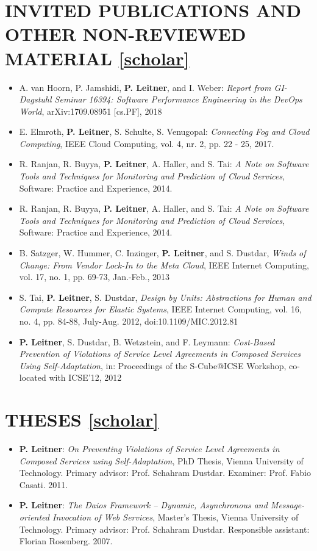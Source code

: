 \documentclass[paper=letter,fontsize=11pt]{scrartcl} %
\newcommand{\NewPart}[2]{\section*{\uppercase{#1} #2}}
\begin{document}
\NewPart{Invited Publications and Other Non-Reviewed Material}{\href{https://scholar.google.ch/citations?user=wZ9f8CAAAAAJ}{[scholar]}}

\begin{itemize}
	\item A. van Hoorn, P. Jamshidi, \textbf{P. Leitner}, and I. Weber:
	\emph{Report from GI-Dagstuhl Seminar 16394: Software Performance Engineering in the DevOps World}, arXiv:1709.08951 [cs.PF], 2018
	\item E. Elmroth, \textbf{P. Leitner}, S. Schulte, S. Venugopal:
  \emph{Connecting Fog and Cloud Computing}, IEEE Cloud Computing, vol. 4, nr. 2, pp. 22 - 25, 2017.
	\item R. Ranjan, R. Buyya, \textbf{P. Leitner}, A. Haller, and S. Tai:
  \emph{A Note on Software Tools and Techniques for Monitoring and Prediction of Cloud Services}, Software: Practice and Experience, 2014.
  \item R. Ranjan, R. Buyya, \textbf{P. Leitner}, A. Haller, and S. Tai:
  \emph{A Note on Software Tools and Techniques for Monitoring and Prediction of Cloud Services}, Software: Practice and Experience, 2014.
  \item B. Satzger, W. Hummer, C. Inzinger, \textbf{P. Leitner}, and S. Dustdar, \emph{Winds of Change: From Vendor Lock-In to the Meta Cloud}, IEEE Internet Computing, vol. 17, no. 1, pp. 69-73, Jan.-Feb., 2013
  \item S. Tai, \textbf{P. Leitner}, S. Dustdar, \emph{Design by Units: Abstractions for Human and Compute Resources for Elastic Systems}, IEEE Internet Computing, vol. 16, no. 4, pp. 84-88, July-Aug. 2012, doi:10.1109/MIC.2012.81
  \item \textbf{P. Leitner}, S. Dustdar, B. Wetzstein, and F.
  Leymann: \emph{Cost-Based Prevention of Violations of Service Level Agreements
  in Composed Services Using Self-Adaptation}, in: Proceedings of the S-Cube@ICSE Workshop, co-located with ICSE'12, 2012
\end{itemize}

\NewPart{Theses}{\href{https://scholar.google.ch/citations?user=wZ9f8CAAAAAJ}{[scholar]}}

\begin{itemize}
  \item \textbf{P. Leitner}: \emph{On Preventing Violations of Service Level
  Agreements in Composed Services using Self-Adaptation},  PhD Thesis, Vienna
  University of Technology. Primary advisor: Prof. Schahram Dustdar. Examiner:
  Prof. Fabio Casati. 2011.
  \item \textbf{P. Leitner}: \emph{The Daios Framework -- Dynamic, Asynchronous
  and Message-oriented Invocation of Web Services},  Master's Thesis, Vienna
  University of Technology. Primary advisor: Prof. Schahram Dustdar. Responsible
  assistant: Florian Rosenberg. 2007.
\end{itemize}
\end{document}
